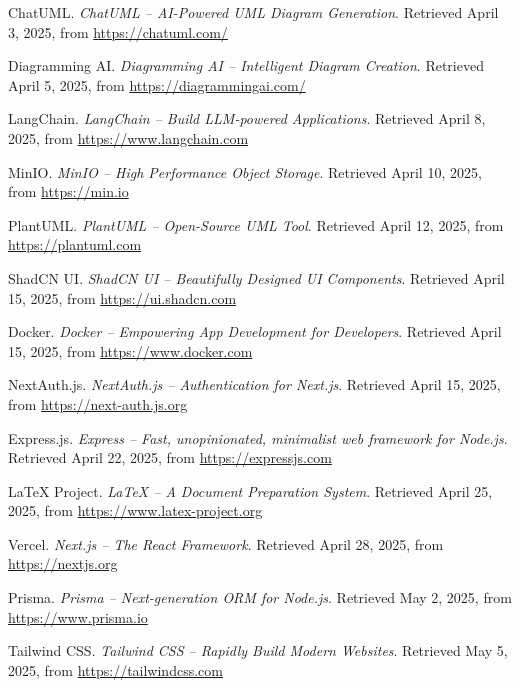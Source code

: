 \begin{thebibliography}{99}

    ChatUML. \textit{ChatUML – AI-Powered UML Diagram Generation}. Retrieved April 3, 2025, from \url{https://chatuml.com/}
    
    Diagramming AI. \textit{Diagramming AI – Intelligent Diagram Creation}. Retrieved April 5, 2025, from \url{https://diagrammingai.com/}
    
    LangChain. \textit{LangChain – Build LLM-powered Applications}. Retrieved April 8, 2025, from \url{https://www.langchain.com}

    MinIO. \textit{MinIO – High Performance Object Storage}. Retrieved April 10, 2025, from \url{https://min.io}

    PlantUML. \textit{PlantUML – Open-Source UML Tool}. Retrieved April 12, 2025, from \url{https://plantuml.com}

    ShadCN UI. \textit{ShadCN UI – Beautifully Designed UI Components}. Retrieved April 15, 2025, from \url{https://ui.shadcn.com}

    Docker. \textit{Docker – Empowering App Development for Developers}. Retrieved April 15, 2025, from \url{https://www.docker.com}

    NextAuth.js. \textit{NextAuth.js – Authentication for Next.js}. Retrieved April 15, 2025, from \url{https://next-auth.js.org}

    Express.js. \textit{Express – Fast, unopinionated, minimalist web framework for Node.js}. Retrieved April 22, 2025, from \url{https://expressjs.com}

    LaTeX Project. \textit{LaTeX – A Document Preparation System}. Retrieved April 25, 2025, from \url{https://www.latex-project.org}

    Vercel. \textit{Next.js – The React Framework}. Retrieved April 28, 2025, from \url{https://nextjs.org}

    Prisma. \textit{Prisma – Next-generation ORM for Node.js}. Retrieved May 2, 2025, from \url{https://www.prisma.io}

    Tailwind CSS. \textit{Tailwind CSS – Rapidly Build Modern Websites}. Retrieved May 5, 2025, from \url{https://tailwindcss.com}


\end{thebibliography}
